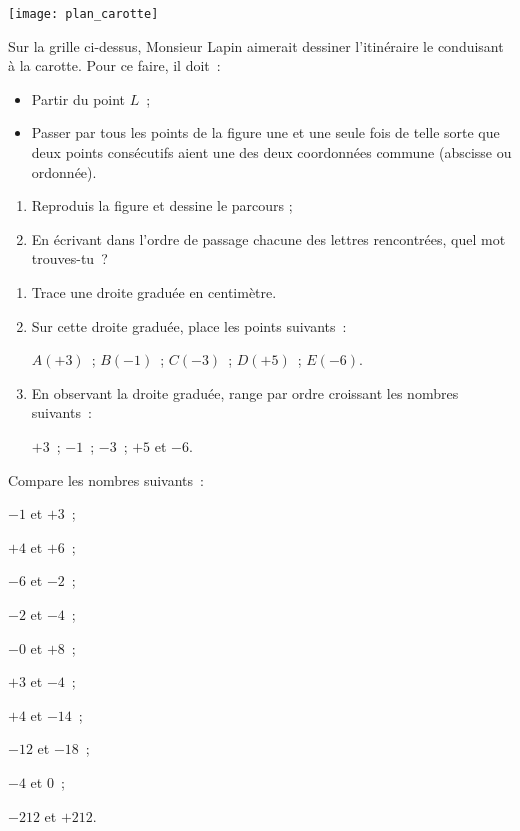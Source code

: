 \begin{exercice}
\begin{center} \texttt{[image: plan\_carotte]} \end{center}
Sur la grille ci-dessus, Monsieur Lapin aimerait dessiner l'itinéraire le conduisant à la carotte. Pour ce faire, il doit : 
\begin{itemize}
 \item Partir du point $L$ ; 
 \item Passer par tous les points de la figure une et une seule fois de telle sorte que deux points consécutifs aient une des deux coordonnées commune (abscisse ou ordonnée).
 \end{itemize}
 \begin{enumerate}
  \item Reproduis la figure et dessine le parcours ;
  \item En écrivant dans l'ordre de passage chacune des lettres rencontrées, quel mot trouves-tu ?
  \end{enumerate}
\end{exercice}





\begin{exercice}
\begin{enumerate}
 \item Trace une droite graduée en centimètre.
 \item Sur cette droite graduée, place les points suivants :

\begin{center} $A (+ 3)$ ; $B (- 1)$ ; $C (- 3)$ ; $D (+ 5)$ ; $E (- 6)$. \end{center}
 \item En observant la droite graduée, range par ordre croissant les nombres suivants :
 
\begin{center} $+ 3$ ; $- 1$ ; $- 3$ ; $+ 5$ et $- 6$.\end{center}
 \end{enumerate}
\end{exercice}


\begin{exercice}
Compare les nombres suivants :
\begin{colenumerate}{2}
 \item $- 1$ et $+ 3$ ;
 \item $+ 4$ et $+ 6$ ;
 \item $- 6	$ et $- 2$ ;
 \item $- 2$ et $- 4$ ;
 \item $- 0$ et $+ 8$ ;
 \item $+ 3$ et $- 4$ ;
 \item $+ 4$ et $- 14$ ;
 \item $- 12$ et $- 18$ ;
 \item $- 4$ et 0 ;
 \item $- 212$ et $+ 212$.
 \end{colenumerate}
 \end{exercice}
 
